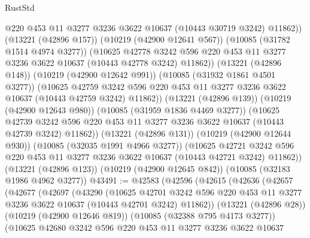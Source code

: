 \begin{lexlean}{RustStd}
\begin{coremodule}
                @220
                @453
                @11
                @3277
                @3236
                @3622
                @10637
                (@10443 @30719 @3242)
                @11862))
            (@13221 (@42896 @157))
            (@10219 (@42900 @12641 @567))
            (@10085 (@31782 @1514 @4974 @3277))
            (@10625
              @42778
              @3242
              @596
              @220
              @453
              @11
              @3277
              @3236
              @3622
              @10637
              (@10443 @42778 @3242)
              @11862))
          (@13221 (@42896 @148))
          (@10219 (@42900 @12642 @991))
          (@10085 (@31932 @1861 @4501 @3277))
          (@10625
            @42759
            @3242
            @596
            @220
            @453
            @11
            @3277
            @3236
            @3622
            @10637
            (@10443 @42759 @3242)
            @11862))
        (@13221 (@42896 @139))
        (@10219 (@42900 @12643 @980))
        (@10085 (@31959 @1836 @4469 @3277))
        (@10625
          @42739
          @3242
          @596
          @220
          @453
          @11
          @3277
          @3236
          @3622
          @10637
          (@10443 @42739 @3242)
          @11862))
      (@13221 (@42896 @131))
      (@10219 (@42900 @12644 @930))
      (@10085 (@32035 @1991 @4966 @3277))
      (@10625
        @42721
        @3242
        @596
        @220
        @453
        @11
        @3277
        @3236
        @3622
        @10637
        (@10443 @42721 @3242)
        @11862))
    (@13221 (@42896 @123))
    (@10219 (@42900 @12645 @842))
    (@10085 (@32183 @1986 @4962 @3277))
@43491 := @42583
    (@42596
      (@42615
        (@42636
          (@42657
            (@42677
              (@42697
                (@43290
                  (@10625
                    @42701
                    @3242
                    @596
                    @220
                    @453
                    @11
                    @3277
                    @3236
                    @3622
                    @10637
                    (@10443 @42701 @3242)
                    @11862))
                (@13221 (@42896 @28))
                (@10219 (@42900 @12646 @819))
                (@10085 (@32388 @795 @4173 @3277))
                (@10625
                  @42680
                  @3242
                  @596
                  @220
                  @453
                  @11
                  @3277
                  @3236
                  @3622
                  @10637

\end{coremodule}
\end{lexlean}
